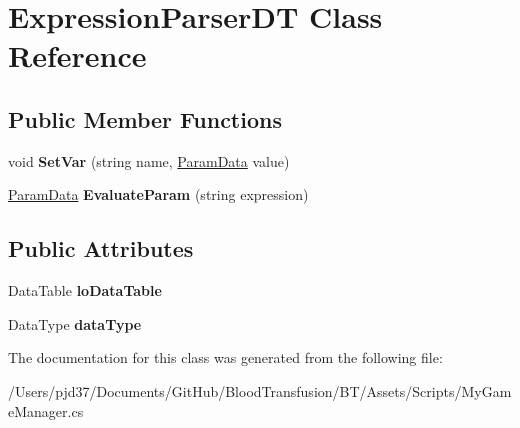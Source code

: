 \hypertarget{class_expression_parser_d_t}{}\section{Expression\+Parser\+DT Class Reference}
\label{class_expression_parser_d_t}
\subsection*{Public Member Functions}
\begin{DoxyCompactItemize}
\item 
void {\bfseries Set\+Var} (string name, \hyperlink{class_param_data}{Param\+Data} value)\hypertarget{class_expression_parser_d_t_afb79789782db3253ec2b5b54a042834f}{}\label{class_expression_parser_d_t_afb79789782db3253ec2b5b54a042834f}

\item 
\hyperlink{class_param_data}{Param\+Data} {\bfseries Evaluate\+Param} (string expression)\hypertarget{class_expression_parser_d_t_ab73e5422254a83bb4ccd9f746ea84cc2}{}\label{class_expression_parser_d_t_ab73e5422254a83bb4ccd9f746ea84cc2}

\end{DoxyCompactItemize}
\subsection*{Public Attributes}
\begin{DoxyCompactItemize}
\item 
Data\+Table {\bfseries lo\+Data\+Table}\hypertarget{class_expression_parser_d_t_abd243e927c9d496088821dac61086868}{}\label{class_expression_parser_d_t_abd243e927c9d496088821dac61086868}

\item 
Data\+Type {\bfseries data\+Type}\hypertarget{class_expression_parser_d_t_a9199550fe6c2f63f7f7710d7f8fb8972}{}\label{class_expression_parser_d_t_a9199550fe6c2f63f7f7710d7f8fb8972}

\end{DoxyCompactItemize}


The documentation for this class was generated from the following file\+:\begin{DoxyCompactItemize}
\item 
/\+Users/pjd37/\+Documents/\+Git\+Hub/\+Blood\+Transfusion/\+B\+T/\+Assets/\+Scripts/My\+Game\+Manager.\+cs\end{DoxyCompactItemize}
